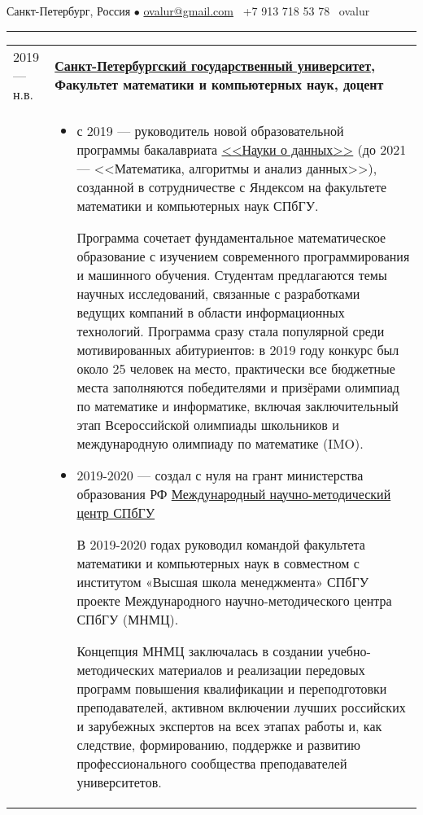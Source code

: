 \documentclass[11pt]{article}
\newif\ifdetailed
\begin{document}
%

\vspace{0.5em}

\noindent Санкт-Петербург, Россия $\bullet$ \href{mailto:ovalur@gmail.com}{ovalur@gmail.com} \faMobile~+7 913 718 53 78 \faSendO~ovalur

\vspace{0.5em}
\hrule
\vspace{0.5em}

\begin{longtable} {l | p{}}
2019 — н.в. & {\textbf{\href{https://spbu.ru}{Санкт-Петербургский государственный университет}, Факультет математики и компьютерных наук, доцент}} \\
\ifdetailed
&
\begin{itemize}
	\item с 2019 — руководитель новой образовательной программы бакалавриата \href{https://maad.compscicenter.ru}{<<Науки о данных>>} (до 2021 — <<Математика, алгоритмы и анализ данных>>), созданной в сотрудничестве с Яндексом на факультете математики и компьютерных наук СПбГУ.

	Программа сочетает фундаментальное математическое образование с изучением современного программирования и машинного обучения. Студентам предлагаются темы научных исследований, связанные с разработками ведущих компаний в области информационных технологий. Программа сразу стала популярной среди мотивированных абитуриентов: в 2019 году конкурс был около 25 человек на место, практически все бюджетные места заполняются победителями и призёрами олимпиад по математике и информатике, включая заключительный этап Всероссийской олимпиады школьников и международную олимпиаду по математике (IMO).

	\item 2019-2020 — создал с нуля на грант министерства образования РФ \href{https://gsom.spbu.ru/all_news/event2021-02-04/}{Международный научно-методический центр СПбГУ}

	В 2019-2020 годах руководил командой факультета математики и компьютерных наук в совместном с институтом «Высшая школа менеджмента» СПбГУ проекте Международного научно-методического центра СПбГУ (МНМЦ).

	Концепция МНМЦ заключалась в создании учебно-методических материалов и реализации передовых программ повышения квалификации и переподготовки преподавателей, активном включении лучших российских и зарубежных экспертов на всех этапах работы и, как следствие, формированию, поддержке и развитию профессионального сообщества преподавателей университетов.


\end{itemize}
\end{longtable}
\end{document}
